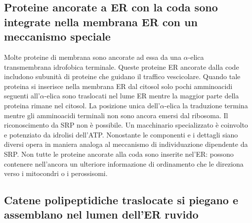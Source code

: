 \subsection{Proteine ancorate a ER con la coda sono integrate nella membrana ER con un meccanismo speciale}
Molte proteine di membrana sono ancorate ad essa da una $\alpha$-elica transmembrana idrofobica  terminale. Queste proteine ER ancorate dalla code includono subunit\`a di proteine 
che guidano il traffico vescicolare. Quando tale proteina si inserisce nella membrana ER dal citosol  solo pochi amminoacidi seguenti all'$\alpha$-elica sono traslocati nel lume ER 
mentre la maggior parte della proteina rimane nel citosol. La posizione unica dell'$\alpha$-elica la traduzione termina mentre gli amminoacidi  terminali non sono ancora emersi
dal ribosoma. Il riconoscimento da SRP non \`e possibile. Un macchinario specializzato \`e coinvolto e potenziato da idrolisi dell'ATP. Nonostante le componenti e i dettagli  siano 
diversi opera in maniera analoga al meccanismo di individuazione dipendente da SRP. Non tutte le proteine ancorate alla coda sono inserite nel'ER: possono contenere nell'ancora
un ulteriore informazione di ordinamento che le direziona verso i mitocondri o i perossisomi. 
\subsection{Catene polipeptidiche traslocate si piegano e assemblano nel lumen dell'ER ruvido}


